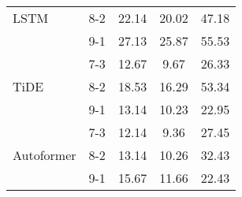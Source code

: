 \begin{table}[h!]
\begin{tabular}{|l|c|c|c|c|}
    \rowcolor{white} LSTM & 8-2 & 22.14 & 20.02 & 47.18 \\ 
    \rowcolor{white}  & 9-1 & 27.13 & 25.87 & 55.53 \\ \hline
    \rowcolor{white!30} & 7-3 & 12.67 & 9.67 & 26.33 \\ 
    \rowcolor{white!30} TiDE & 8-2 & 18.53 & 16.29 & 53.34 \\ 
    \rowcolor{white!30} & 9-1 & 13.14 & 10.23 & 22.95 \\ \hline
    \rowcolor{white}  & 7-3 & 12.14 & 9.36 & 27.45 \\ 
    \rowcolor{white}  Autoformer & 8-2 & 13.14 & 10.26 & 32.43 \\ 
    \rowcolor{white}  & 9-1 & 15.67 & 11.66 & 22.43 \\ \hline

    \end{tabular}
\end{table}